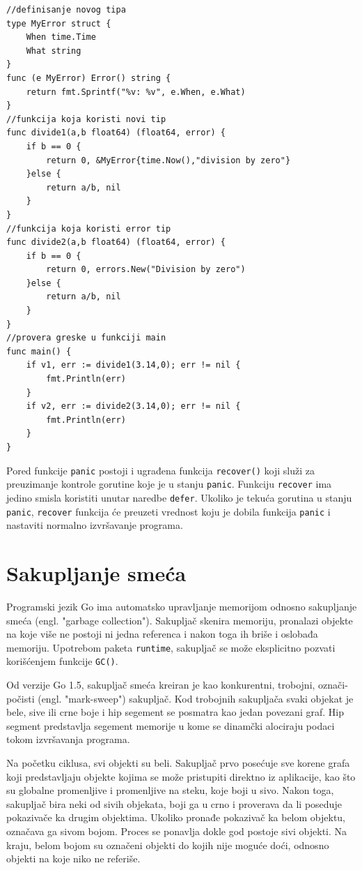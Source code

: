 \documentclass[12pt,oneside]{memoir}
\begin{document}
\begin{center}
\begin{lstlisting}[caption=Upravljanje greškama, label={lst:error},  backgroundcolor=\color{background}]
//definisanje novog tipa
type MyError struct {
	When time.Time
	What string
}
func (e MyError) Error() string {
	return fmt.Sprintf("%v: %v", e.When, e.What)
}
//funkcija koja koristi novi tip
func divide1(a,b float64) (float64, error) {
	if b == 0 {
		return 0, &MyError{time.Now(),"division by zero"}
	}else {
		return a/b, nil
	}
}
//funkcija koja koristi error tip
func divide2(a,b float64) (float64, error) {
	if b == 0 {
		return 0, errors.New("Division by zero")
	}else {
		return a/b, nil
	}
}
//provera greske u funkciji main
func main() {
	if v1, err := divide1(3.14,0); err != nil {
		fmt.Println(err)				
	}
	if v2, err := divide2(3.14,0); err != nil {
		fmt.Println(err)			
	}
}
\end{lstlisting}
\end{center}

Pored funkcije \texttt{panic} postoji i ugrađena funkcija \texttt{recover()} koji služi za preuzimanje kontrole gorutine koje je u stanju \texttt{panic}. Funkciju \texttt{recover} ima jedino smisla koristiti unutar naredbe \texttt{defer}. Ukoliko je tekuća gorutina u stanju \texttt{panic}, \texttt{recover} funkcija će preuzeti vrednost koju je dobila funkcija \texttt{panic} i nastaviti normalno izvršavanje programa.
 
\section{Sakupljanje smeća}

Programski jezik Go ima automatsko upravljanje memorijom odnosno sakupljanje smeća (engl. "garbage collection"). Sakupljač skenira memoriju, pronalazi objekte na koje više ne postoji ni jedna referenca i nakon toga ih briše i oslobađa memoriju. Upotrebom paketa \texttt{runtime},  sakupljač se može eksplicitno pozvati korišćenjem funkcije \texttt{GC()}. 

Od verzije Go 1.5,  sakupljač smeća \cite{garbage} kreiran je kao konkurentni, trobojni, označi-počisti (engl. "mark-sweep") sakupljač. Kod trobojnih sakupljača svaki objekat je bele, sive ili crne boje i hip segement se posmatra kao jedan povezani graf. Hip segment predstavlja segement memorije u kome se dinamčki alociraju podaci tokom izvršavanja programa.

Na početku ciklusa, svi objekti su beli. Sakupljač prvo posećuje sve korene grafa koji predstavljaju objekte kojima se može pristupiti direktno iz aplikacije, kao što su globalne promenljive i promenljive na steku, koje boji u sivo. Nakon toga, sakupljač bira neki od sivih objekata, boji ga u crno i proverava da li poseduje pokazivače ka drugim objektima. Ukoliko pronađe pokazivač ka belom objektu, označava ga sivom bojom. Proces se ponavlja dokle god postoje sivi objekti. Na kraju, belom bojom su označeni objekti do kojih nije moguće doći, odnosno objekti na koje niko ne referiše.
\end{document}
